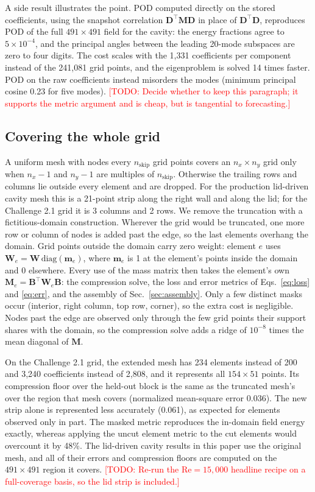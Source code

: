 \documentclass[conf]{new-aiaa}
\newcommand{\todo}[1]{\textcolor{red}{[TODO: #1]}}
\newcommand{\Rey}{\mathrm{Re}}
\begin{document}
A side result illustrates the point. POD computed directly on the stored coefficients, using the snapshot correlation $\mathbf{D}^{\top}\mathbf{M}\mathbf{D}$ in place of $\mathbf{D}^{\top}\mathbf{D}$, reproduces POD of the full $491\times491$ field for the cavity: the energy fractions agree to $5\times10^{-4}$, and the principal angles between the leading 20-mode subspaces are zero to four digits. The cost scales with the 1,331 coefficients per component instead of the 241,081 grid points, and the eigenproblem is solved 14 times faster. POD on the raw coefficients instead misorders the modes (minimum principal cosine 0.23 for five modes). \todo{Decide whether to keep this paragraph; it supports the metric argument and is cheap, but is tangential to forecasting.}

\subsection{Covering the whole grid}
\label{sec:fullcover}
A uniform mesh with nodes every $n_\mathrm{skip}$ grid points covers an $n_x\times n_y$ grid only when $n_x-1$ and $n_y-1$ are multiples of $n_\mathrm{skip}$. Otherwise the trailing rows and columns lie outside every element and are dropped. For the production lid-driven cavity mesh this is a 21-point strip along the right wall and along the lid; for the Challenge 2.1 grid it is 3 columns and 2 rows. We remove the truncation with a fictitious-domain construction. Wherever the grid would be truncated, one more row or column of nodes is added past the edge, so the last elements overhang the domain. Grid points outside the domain carry zero weight: element $e$ uses $\mathbf{W}_e=\mathbf{W}\,\mathrm{diag}(\mathbf{m}_e)$, where $\mathbf{m}_e$ is 1 at the element's points inside the domain and 0 elsewhere. Every use of the mass matrix then takes the element's own $\mathbf{M}_e=\mathbf{B}^{\top}\mathbf{W}_e\mathbf{B}$: the compression solve, the loss and error metrics of Eqs.~\eqref{eq:loss} and \eqref{eq:err}, and the assembly of Sec.~\ref{sec:assembly}. Only a few distinct masks occur (interior, right column, top row, corner), so the extra cost is negligible. Nodes past the edge are observed only through the few grid points their support shares with the domain, so the compression solve adds a ridge of $10^{-8}$ times the mean diagonal of $\mathbf{M}$.

On the Challenge 2.1 grid, the extended mesh has 234 elements instead of 200 and 3,240 coefficients instead of 2,808, and it represents all $154\times51$ points. Its compression floor over the held-out block is the same as the truncated mesh's over the region that mesh covers (normalized mean-square error 0.036). The new strip alone is represented less accurately (0.061), as expected for elements observed only in part. The masked metric reproduces the in-domain field energy exactly, whereas applying the uncut element metric to the cut elements would overcount it by 48\%. The lid-driven cavity results in this paper use the original mesh, and all of their errors and compression floors are computed on the $491\times491$ region it covers. \todo{Re-run the $\Rey=15{,}000$ headline recipe on a full-coverage basis, so the lid strip is included.}
\end{document}
